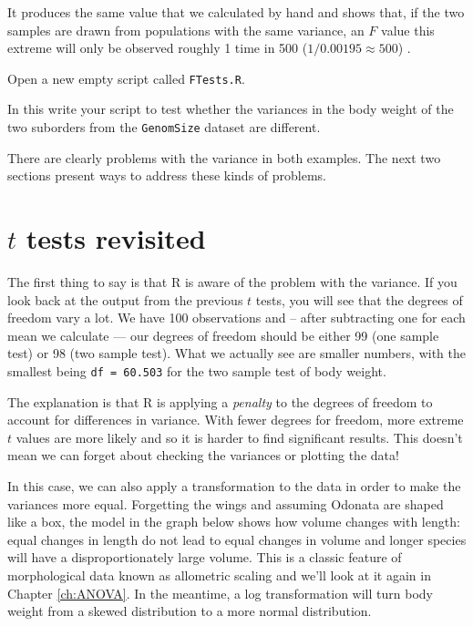 It produces the same value that we calculated by hand and shows that, 
if the two samples are drawn from populations with the same variance,  
an $F$ value this extreme will only be observed roughly 1 time in 500 
($1/0.00195 \approx 500$) .
 
\begin{compactitem}[$\quad\star$]
\item Open a new empty script called {\tt FTests.R}.
\item In this write your script to test whether the variances in the 
body weight of the two suborders from the {\tt GenomSize} dataset are 
different.
\end{compactitem}
 
There are clearly problems with the variance in both examples. The next 
two sections present ways to address these kinds of problems.

\section{$t$ tests revisited}

The first thing to say is that R is aware of the problem with the 
variance. If you look back at the output from the previous $t$ tests, 
you will see that the degrees of freedom vary a lot. We have 100 
observations and -- after subtracting one for each mean we calculate 
--- our degrees of freedom should be either 99 (one sample test) or 98 
(two sample test). What we actually see are smaller numbers, with the 
smallest being {\tt df = 60.503} for the two sample test of body 
weight. 

 
The explanation is that R is applying a \emph{penalty} to the degrees 
of freedom to account for differences in variance. With fewer degrees 
for freedom, more extreme $t$ values are more likely and so it is 
harder to find significant results. This doesn't mean we can forget 
about checking the variances or plotting the data!

In this case, we can also apply a transformation to the data in order 
to make the variances more equal. Forgetting the wings and assuming 
Odonata are shaped like a box, the model in the graph below shows how 
volume changes with length: equal changes in length do not lead to 
equal changes in volume and longer species will have a 
disproportionately large volume. This is a classic feature of 
morphological data known as allometric scaling and we'll look at it 
again in Chapter \ref{ch:ANOVA}. In the meantime, a log transformation will 
turn body weight from a skewed distribution to a more normal 
distribution.
 
